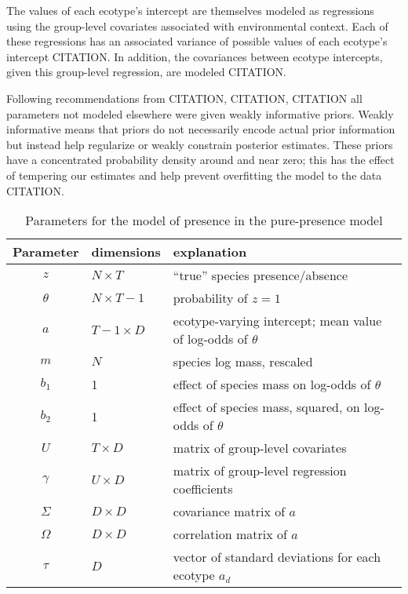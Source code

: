 \documentclass[12pt,letterpaper]{article}
\begin{document}
The values of each ecotype's intercept are themselves modeled as regressions using the group-level covariates associated with environmental context. Each of these regressions has an associated variance of possible values of each ecotype's intercept CITATION. In addition, the covariances between ecotype intercepts, given this group-level regression, are modeled CITATION.

Following recommendations from CITATION, CITATION, CITATION all parameters not modeled elsewhere were given weakly informative priors. Weakly informative means that priors do not necessarily encode actual prior information but instead help regularize or weakly constrain posterior estimates. These priors have a concentrated probability density around and near zero; this has the effect of tempering our estimates and help prevent overfitting the model to the data CITATION. 


\begin{table}
  \centering
  \caption{Parameters for the model of presence in the pure-presence model}
  \begin{tabular}{c l l}
    Parameter & dimensions & explanation \\
    \hline
    \(z\) & \(N \times T\) & ``true'' species presence/absence \\
    \(\theta\) & \(N \times T - 1\) & probability of \(z = 1\) \\
    \(a\) & \(T - 1 \times D\) & ecotype-varying intercept; mean value of log-odds of \(\theta\) \\
    \(m\) & \(N\) & species log mass, rescaled \\
    \(b_{1}\) & 1 & effect of species mass on log-odds of \(\theta\) \\
    \(b_{2}\) & 1 & effect of species mass, squared, on log-odds of \(\theta\) \\
    \(U\) & \(T \times D\) & matrix of group-level covariates \\
    \(\gamma\) & \(U \times D\) & matrix of group-level regression coefficients \\
    \(\Sigma\) & \(D \times D\) & covariance matrix of \(a\) \\
    \(\Omega\) & \(D \times D\) & correlation matrix of \(a\) \\
    \(\tau\) & \(D\) & vector of standard deviations for each ecotype \(a_{d}\) \\
  \end{tabular}
  \label{tab:pres_param}
\end{table}
\end{document}
